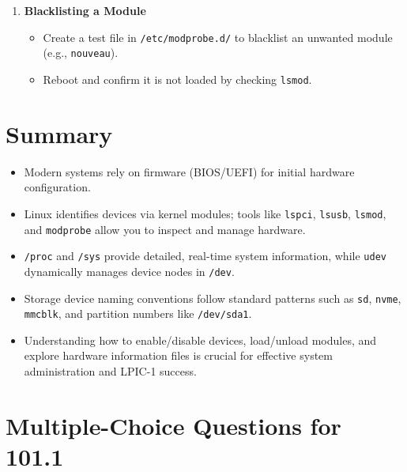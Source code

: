 \documentclass[a4paper]{report}
\begin{document}
\begin{enumerate}
\begin{itemize}
    \end{itemize}

    \item \textbf{Blacklisting a Module}
    \begin{itemize}
        \item Create a test file in \texttt{/etc/modprobe.d/} to blacklist an unwanted module (e.g., \texttt{nouveau}).
        \item Reboot and confirm it is not loaded by checking \texttt{lsmod}.
    \end{itemize}
\end{enumerate}

\section*{Summary}
\begin{itemize}
    \item Modern systems rely on firmware (BIOS/UEFI) for initial hardware configuration.
    \item Linux identifies devices via kernel modules; tools like \texttt{lspci}, \texttt{lsusb}, \texttt{lsmod}, and \texttt{modprobe} allow you to inspect and manage hardware.
    \item \texttt{/proc} and \texttt{/sys} provide detailed, real-time system information, while \texttt{udev} dynamically manages device nodes in \texttt{/dev}.
    \item Storage device naming conventions follow standard patterns such as \texttt{sd}, \texttt{nvme}, \texttt{mmcblk}, and partition numbers like \texttt{/dev/sda1}.
    \item Understanding how to enable/disable devices, load/unload modules, and explore hardware information files is crucial for effective system administration and LPIC-1 success.
\end{itemize}




\newpage
\section*{Multiple-Choice Questions for 101.1}
\end{document}
